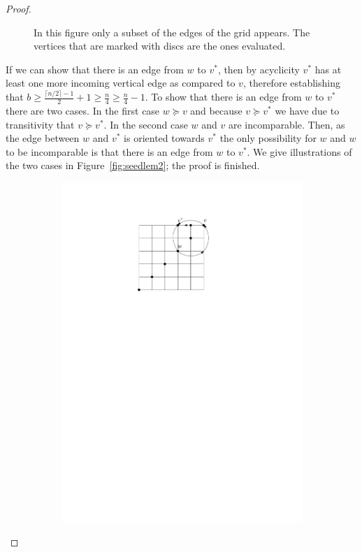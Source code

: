 \documentclass[a4paper,10pt]{article}
\begin{document}
\begin{proof}
\begin{figure}[htbp]
  	\caption{In this figure only a subset of the edges of the grid appears. The vertices that are marked with discs are the ones evaluated.} 
  	\label{fig:seedlem1}
  \end{figure}
   If we can show that there is an edge from $w$ to $v^*$, then by acyclicity $v^*$ has at least one more incoming vertical edge as compared to $v$, therefore establishing that $b \geq \frac{\lceil n/2\rceil-1}{2} + 1 \geq \frac{n}{4} \geq \frac{n}{4} - 1$. To show that there is an edge from $w$ to $v^*$ there are two cases. In the first case $w \succeq v$ and because $v \succeq v^*$ we have due to transitivity that $v \succeq v^*$. In the second case $w$ and $v$ are incomparable. Then, as the edge between $w$ and $v^*$ is  oriented towards $v^*$ the only possibility for $w$ and $w$ to be incomparable is that there is an edge from $w$ to $v^*$. We give illustrations of the two cases in Figure~\ref{fig:seedlem2}; the proof is finished. 
   \begin{figure}[htbp] 
       \centering
       \begin{subfigure}[b]{0.4\textwidth}
           \includegraphics[scale = 0.7]{seedlemma_fig2_cas1.pdf}

\end{subfigure}
\end{figure}
\end{proof}
\end{document}
